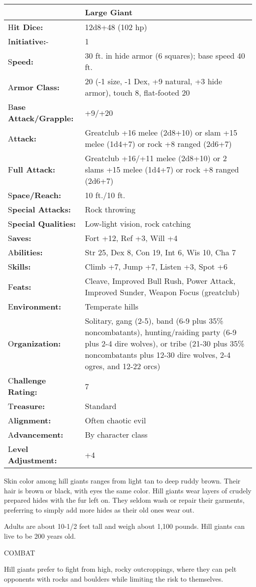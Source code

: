 \documentclass{article}
\begin{document}
\begin{tabular}{|>{\raggedright}p{78pt}|>{\raggedright}p{247pt}|}
\hline
  & Large Giant\tabularnewline
\hline
H\textbf{it Dice:} & 12d8+48 (102 hp)\tabularnewline
\hline
I\textbf{nitiative:}- & 1\tabularnewline
\hline
S\textbf{peed:} & 30 ft. in hide armor (6 squares); base speed 40 ft.\tabularnewline
\hline
A\textbf{rmor Class:} & 20 (-1 size, -1 Dex, +9 natural, +3 hide armor), touch 
8, flat-footed 20\tabularnewline
\hline
B\textbf{ase Attack/Grapple:} & +9/+20\tabularnewline
\hline
A\textbf{ttack:} & Greatclub +16 melee (2d8+10) or slam +15 melee (1d4+7) or rock 
+8 ranged (2d6+7)\tabularnewline
\hline
F\textbf{ull Attack:} & Greatclub +16/+11 melee (2d8+10) or 2 slams +15 melee (1d4+7) 
or rock +8 ranged (2d6+7)\tabularnewline
\hline
S\textbf{pace/Reach:} & 10 ft./10 ft.\tabularnewline
\hline
S\textbf{pecial Attacks:} & Rock throwing\tabularnewline
\hline
S\textbf{pecial Qualities:} & Low-light vision, rock catching\tabularnewline
\hline
S\textbf{aves:} & Fort +12, Ref +3, Will +4\tabularnewline
\hline
A\textbf{bilities:} & Str 25, Dex 8, Con 19, Int 6, Wis 10, Cha 7\tabularnewline
\hline
S\textbf{kills:} & Climb +7, Jump +7, Listen +3, Spot +6\tabularnewline
\hline
F\textbf{eats:} & Cleave, Improved Bull Rush, Power Attack, Improved Sunder, Weapon 
Focus (greatclub)\tabularnewline
\hline
E\textbf{nvironment:} & Temperate hills\tabularnewline
\hline
O\textbf{rganization:} & Solitary, gang (2-5), band (6-9 plus 35\% noncombatants), 
hunting/raiding party (6-9 plus 2-4 dire wolves), or tribe (21-30 plus 35\% noncombatants 
plus 12-30 dire wolves, 2-4 ogres, and 12-22 orcs)\tabularnewline
\hline
C\textbf{hallenge Rating:} & 7\tabularnewline
\hline
T\textbf{reasure:} & Standard\tabularnewline
\hline
A\textbf{lignment:} & Often chaotic evil\tabularnewline
\hline
A\textbf{dvancement:} & By character class\tabularnewline
\hline
L\textbf{evel Adjustment:} & +4\tabularnewline
\hline
\end{tabular}

Skin color among hill giants ranges from light tan to deep ruddy brown. Their hair 
is brown or black, with eyes the same color. Hill giants wear layers of crudely 
prepared hides with the fur left on. They seldom wash or repair their garments, 
preferring to simply add more hides as their old ones wear out.

Adults are about 10-1/2 feet tall and weigh about 1,100 pounds. Hill giants can 
live to be 200 years old.

COMBAT

Hill giants prefer to fight from high, rocky outcroppings, where they can pelt 
opponents with rocks and boulders while limiting the risk to themselves.
\end{document}
